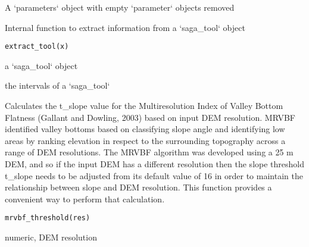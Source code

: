 \documentclass[a4paper]{book}
\begin{document}
%
\begin{Value}
A `parameters` object with empty `parameter` objects removed
\end{Value}
%
\begin{Description}
Internal function to extract information from a `saga\_tool` object
\end{Description}
%
\begin{Usage}
\begin{verbatim}
extract_tool(x)
\end{verbatim}
\end{Usage}
%
\begin{Arguments}
\begin{ldescription}
\item[\code{x}] a `saga\_tool` object
\end{ldescription}
\end{Arguments}
%
\begin{Value}
the intervals of a `saga\_tool`
\end{Value}
%
\begin{Description}
Calculates the t\_slope value for the Multiresolution Index of Valley Bottom
Flatness (Gallant and Dowling, 2003) based on input DEM resolution. MRVBF
identified valley bottoms based on classifying slope angle and identifying
low areas by ranking elevation in respect to the surrounding topography
across a range of DEM resolutions. The MRVBF algorithm was developed using a
25 m DEM, and so if the input DEM has a different resolution then the slope
threshold t\_slope needs to be adjusted from its default value of 16 in order
to maintain the relationship between slope and DEM resolution. This function
provides a convenient way to perform that calculation.
\end{Description}
%
\begin{Usage}
\begin{verbatim}
mrvbf_threshold(res)
\end{verbatim}
\end{Usage}
%
\begin{Arguments}
\begin{ldescription}
\item[\code{res}] numeric, DEM resolution
\end{ldescription}
\end{Arguments}
\end{document}
